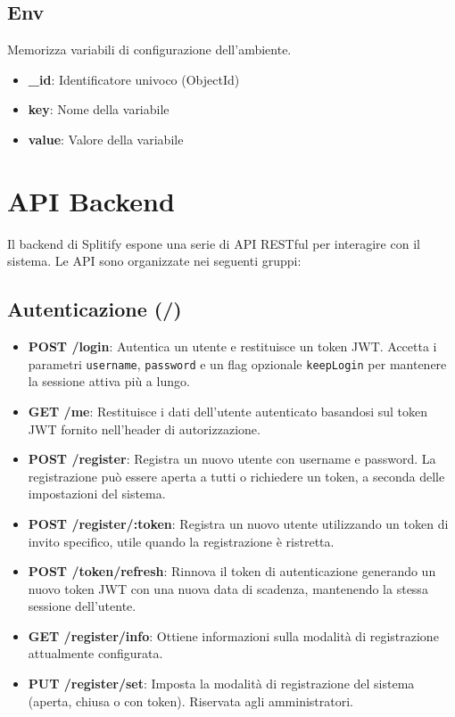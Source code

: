 \documentclass[11pt]{article}
\begin{document}
\subsection{Env}
Memorizza variabili di configurazione dell'ambiente.
\begin{itemize}
    \item \textbf{\_id}: Identificatore univoco (ObjectId)
    \item \textbf{key}: Nome della variabile
    \item \textbf{value}: Valore della variabile
\end{itemize}

\section{API Backend}
Il backend di Splitify espone una serie di API RESTful per interagire con il sistema. Le API sono organizzate nei seguenti gruppi:

\subsection{Autenticazione (/)}
\begin{itemize}
    \item \textbf{POST /login}: Autentica un utente e restituisce un token JWT. Accetta i parametri \texttt{username}, \texttt{password} e un flag opzionale \texttt{keepLogin} per mantenere la sessione attiva più a lungo.
    \item \textbf{GET /me}: Restituisce i dati dell'utente autenticato basandosi sul token JWT fornito nell'header di autorizzazione.
    \item \textbf{POST /register}: Registra un nuovo utente con username e password. La registrazione può essere aperta a tutti o richiedere un token, a seconda delle impostazioni del sistema.
    \item \textbf{POST /register/:token}: Registra un nuovo utente utilizzando un token di invito specifico, utile quando la registrazione è ristretta.
    \item \textbf{POST /token/refresh}: Rinnova il token di autenticazione generando un nuovo token JWT con una nuova data di scadenza, mantenendo la stessa sessione dell'utente.
    \item \textbf{GET /register/info}: Ottiene informazioni sulla modalità di registrazione attualmente configurata.
    \item \textbf{PUT /register/set}: Imposta la modalità di registrazione del sistema (aperta, chiusa o con token). Riservata agli amministratori.
\end{itemize}
\end{document}
